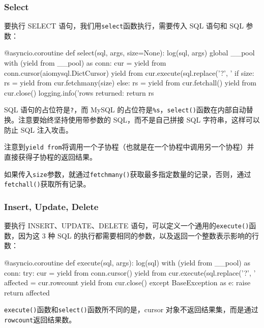 \hypertarget{select}{%
\subsubsection{Select}\label{select}}

要执行 SELECT 语句，我们用\texttt{select}函数执行，需要传入 SQL 语句和
SQL 参数：

\begin{pythoncode}
@asyncio.coroutine
def select(sql, args, size=None):
    log(sql, args)
    global __pool
    with (yield from __pool) as conn:
        cur = yield from conn.cursor(aiomysql.DictCursor)
        yield from cur.execute(sql.replace('?', '%
        if size:
            rs = yield from cur.fetchmany(size)
        else:
            rs = yield from cur.fetchall()
        yield from cur.close()
        logging.info('rows returned: %
        return rs
\end{pythoncode}

SQL 语句的占位符是\texttt{?}，而 MySQL
的占位符是\texttt{\%s}，\texttt{select()}函数在内部自动替换。注意要始终坚持使用带参数的
SQL，而不是自己拼接 SQL 字符串，这样可以防止 SQL 注入攻击。

注意到\texttt{yield\ from}将调用一个子协程（也就是在一个协程中调用另一个协程）并直接获得子协程的返回结果。

如果传入\texttt{size}参数，就通过\texttt{fetchmany()}获取最多指定数量的记录，否则，通过\texttt{fetchall()}获取所有记录。

\hypertarget{insert-update-delete}{%
\subsubsection{Insert, Update, Delete}\label{insert-update-delete}}

要执行 INSERT、UPDATE、DELETE
语句，可以定义一个通用的\texttt{execute()}函数，因为这 3 种 SQL
的执行都需要相同的参数，以及返回一个整数表示影响的行数：

\begin{pythoncode}
@asyncio.coroutine
def execute(sql, args):
    log(sql)
    with (yield from __pool) as conn:
        try:
            cur = yield from conn.cursor()
            yield from cur.execute(sql.replace('?', '%
            affected = cur.rowcount
            yield from cur.close()
        except BaseException as e:
            raise
        return affected
\end{pythoncode}

\texttt{execute()}函数和\texttt{select()}函数所不同的是，cursor
对象不返回结果集，而是通过\texttt{rowcount}返回结果数。


